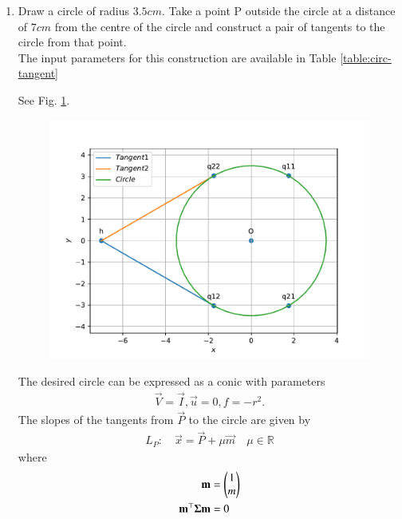 \documentclass[journal,12pt,twocolumn]{IEEEtran}
\renewcommand\thesection{\arabic{section}}
\begin{document}
\begin{enumerate}[label=\thesection.\arabic*.,ref=\thesection.\theenumi]
    \item Draw a circle of radius $3.5 cm$. Take a point P outside the circle at a distance of $7 cm$ from the centre of the circle and construct a pair of tangents to the circle from that point. \\
	    \solution The input parameters for this construction are available in Table 
	\eqref{table:circ-tangent}
\begin{table}[ht!]
	
\caption{}
	\label{table:circ-tangent}
\end{table}
See Fig.
	  \ref{fig:matrix-10-13.pdf}.
  \begin{figure}
	  \centering 
	  \includegraphics[width=\columnwidth]{figs/matrix-10-13.pdf}
	  \caption{}
	  \label{fig:matrix-10-13.pdf}
	  \end{figure}
	  The desired circle can be expressed as a conic with parameters
\begin{align}
	\vec{V}
	=\vec{I},
\vec{u} = 0,  f = -r^2.
	\label{eq:matrix-10-13-param}
\end{align}
%
The slopes of the tangents from $\vec{P}$ to  the circle are given by 
\begin{align}
L_P: \quad \vec{x} = \vec{P} + \mu \vec{m} \quad \mu \in \mathbb{R}
\label{eq:conic_tangent-q}
\end{align}
where 
	\begin{align}
  \label{eq:conic_tangent_dirvec-h}
		\vec{m} &= \myvec{1 \\ m}
		\\
\vec{m}^{\top}\bm{\Sigma}
		\vec{m} &= 0
  \label{eq:conic_tangent_qquad-h}

\end{align}
\end{enumerate}
\end{document}
